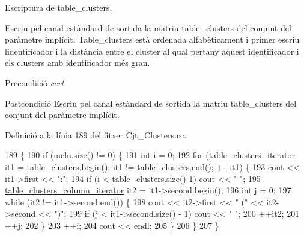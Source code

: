 Escriptura de table\+\_\+clusters. 

Escriu pel canal estàndard de sortida la matriu table\+\_\+clusters del conjunt del paràmetre implícit. Table\+\_\+clusters està ordenada alfabèticament i primer escriu l\textquotesingle{}identificador i la distància entre el cluster al qual pertany aquest identificador i els clusters amb identificador més gran.

\begin{DoxyPrecond}{Precondició}
{\itshape cert} 
\end{DoxyPrecond}
\begin{DoxyPostcond}{Postcondició}
Escriu pel canal estàndard de sortida la matriu table\+\_\+clusters del conjunt del paràmetre implícit. 
\end{DoxyPostcond}


Definició a la línia 189 del fitxer Cjt\+\_\+\+Clusters.\+cc.


\begin{DoxyCode}
189                                         \{
190     \textcolor{keywordflow}{if} (\hyperlink{class_cjt___clusters_a5f5e13255bca1fac2ad65c51473f6ead}{mclu}.size() != 0) \{
191         \textcolor{keywordtype}{int} i = 0;
192         \textcolor{keywordflow}{for} (\hyperlink{class_cjt___clusters_ac53ace59de6ecf75f90d7a4fc6e56c0e}{table\_clusters\_iterator} it1 = \hyperlink{class_cjt___clusters_a6af3fcf70683cdb88f137f6f51002939}{table\_clusters}.begin(); it1
       != \hyperlink{class_cjt___clusters_a6af3fcf70683cdb88f137f6f51002939}{table\_clusters}.end(); ++it1) \{
193             cout << it1->first << \textcolor{stringliteral}{":"};
194             \textcolor{keywordflow}{if} (i < \hyperlink{class_cjt___clusters_a6af3fcf70683cdb88f137f6f51002939}{table\_clusters}.size()-1) cout << \textcolor{stringliteral}{" "};
195             \hyperlink{class_cjt___clusters_abdef6142bd4683a878bb393a9095555e}{table\_clusters\_column\_iterator} it2 = it1->second.begin();
196             \textcolor{keywordtype}{int} j = 0;
197             \textcolor{keywordflow}{while} (it2 != it1->second.end()) \{
198                 cout << it2->first << \textcolor{stringliteral}{" ("} << it2->second << \textcolor{stringliteral}{")"};
199                 \textcolor{keywordflow}{if} (j < it1->second.size() - 1) cout << \textcolor{stringliteral}{" "};
200                 ++it2;
201                 ++j;
202             \}
203             ++i;
204             cout << endl;
205         \}
206     \}
207 \}
\end{DoxyCode}


